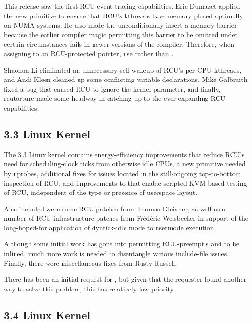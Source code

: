 This release saw the first RCU event-tracing capabilities.
Eric Dumazet applied the new
 primitive to ensure that RCU's
kthreads have memory placed optimally on NUMA systems.
He also
made the  unconditionally insert a
memory barrier because the earlier compiler magic permitting this
barrier to be omitted under certain circumstances fails in newer
versions of the compiler.
Therefore, when assigning  to an RCU-protected pointer,
use  rather than .

Shaohua Li eliminated an unnecessary self-wakeup of RCU's per-CPU
kthreads, and Andi Kleen cleaned up some conflicting variable
declarations.
Mike Galbraith fixed a bug that caused RCU to ignore the
 kernel parameter, and finally,
rcutorture made some headway in catching up to the ever-expanding
RCU capabilities.

\subsection{3.3 Linux Kernel}

The 3.3 Linux kernel contains
energy-efficiency improvements that reduce RCU's need for
scheduling-clock ticks from otherwise idle CPUs,
a new  primitive needed by uprobes,
additional fixes for issues located in the still-ongoing top-to-bottom
inspection of RCU,
and improvements to  that enable scripted KVM-based
testing of RCU, independent of the type or presence of userspace layout.

Also included were some  RCU patches from Thomas Gleixner,
as well as
a number of RCU-infrastructure patches from Fr\'ed\'eric Weisbecker
in support of the long-hoped-for application of dyntick-idle mode
to usermode execution.

Although some initial work has gone into permitting RCU-preempt's
 and  to be inlined,
much more work is needed to disentangle various include-file issues.
Finally, there were miscellaneous fixes from Rusty Russell.

There has been an initial request for ,
but given that the requester found another way to solve this problem,
this has relatively low priority.

\subsection{3.4 Linux Kernel}

